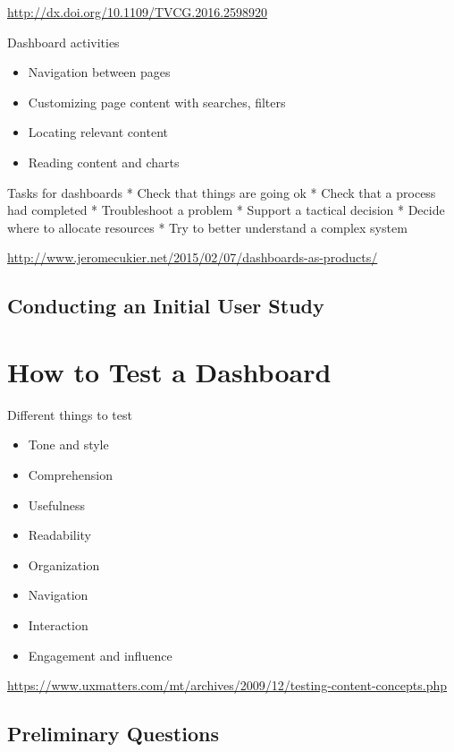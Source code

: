 \documentclass[
]{krantz}
\providecommand{\tightlist}{%
  \setlength{\itemsep}{0pt}\setlength{\parskip}{0pt}}
\begin{document}
\url{http://dx.doi.org/10.1109/TVCG.2016.2598920}

Dashboard activities

\begin{itemize}
\tightlist
\item
  Navigation between pages
\item
  Customizing page content with searches, filters
\item
  Locating relevant content
\item
  Reading content and charts
\end{itemize}

Tasks for dashboards
* Check that things are going ok
* Check that a process had completed
* Troubleshoot a problem
* Support a tactical decision
* Decide where to allocate resources
* Try to better understand a complex system

\url{http://www.jeromecukier.net/2015/02/07/dashboards-as-products/}

\hypertarget{conducting-an-initial-user-study}{%
\subsection{Conducting an Initial User Study}\label{conducting-an-initial-user-study}}

\hypertarget{how-to-test-a-dashboard}{%
\section{How to Test a Dashboard}\label{how-to-test-a-dashboard}}

Different things to test

\begin{itemize}
\tightlist
\item
  Tone and style
\item
  Comprehension
\item
  Usefulness
\item
  Readability
\item
  Organization
\item
  Navigation
\item
  Interaction
\item
  Engagement and influence
\end{itemize}

\url{https://www.uxmatters.com/mt/archives/2009/12/testing-content-concepts.php}

\hypertarget{preliminary-questions}{%
\subsection{Preliminary Questions}\label{preliminary-questions}}
\end{document}
